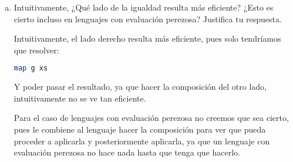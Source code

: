 \documentclass[spanish,12pt,letterpaper]{article}
\begin{document}
\begin{enumerate}[(a)]
  \item Intuitivamente, ¿Qué lado de la igualdad resulta más eficiente? ¿Esto es
    cierto incluso en lenguajes con evaluación perezosa? Justifica tu respuesta.

    Intuitivamente, el lado derecho resulta más eficiente, pues solo tendríamos
    que resolver:
    \begin{lstlisting}[language=Haskell]
      map g xs
    \end{lstlisting}
    Y poder pasar el resultado, ya que hacer la composición del otro lado,
    intuitivamente no se ve tan eficiente.

    Para el caso de lenguajes con evaluación perezosa no creemos que sea cierto,
    pues le combiene al lenguaje hacer la composición para ver que pueda proceder
    a aplicarla y posteriormente aplicarla, ya que un lenguaje con evaluación
    perezosa no hace nada hasta que tenga que hacerlo.
  \end{enumerate}
\end{document}
